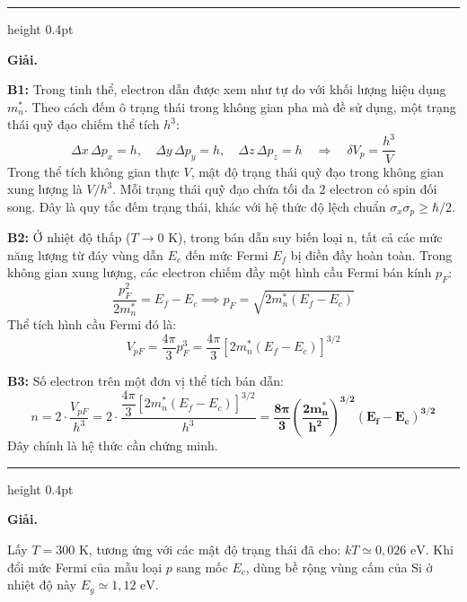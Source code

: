 \documentclass[11pt,a4paper]{article}
\renewcommand{\boldsymbol}[1]{\symbf{#1}}
\let\DeBaiOriginal\DeBai
\renewcommand{\DeBai}[1]{\par\Needspace{5\baselineskip}\DeBaiOriginal{#1}}
\newcommand{\PhanCachBai}{%
  \par\Needspace{7\baselineskip}%
  \addvspace{6pt}%
  {\color{black!40}\hrule height 0.4pt}%
  \nobreak\vspace{7pt}\nobreak
}
\begin{document}
\PhanCachBai


\textbf{Giải.}

\textbf{B1:} Trong tinh thể, electron dẫn được xem như tự do với khối lượng hiệu dụng $m_n^*$. Theo cách đếm ô trạng thái trong không gian pha mà đề sử dụng, một trạng thái quỹ đạo chiếm thể tích $h^3$:
\begin{equation*}
    \Delta x\,\Delta p_x=h,\quad \Delta y\,\Delta p_y=h,\quad \Delta z\,\Delta p_z=h\quad\Rightarrow\quad \delta V_p=\frac{h^3}{V}
\end{equation*}
Trong thể tích không gian thực $V$, mật độ trạng thái quỹ đạo trong không gian xung lượng là $V/h^3$. Mỗi trạng thái quỹ đạo chứa tối đa 2 electron có spin đối song. Đây là quy tắc đếm trạng thái, khác với hệ thức độ lệch chuẩn $\sigma_x\sigma_p\ge\hbar/2$.

\textbf{B2:} Ở nhiệt độ thấp ($T \to 0\text{ K}$), trong bán dẫn suy biến loại n, tất cả các mức năng lượng từ đáy vùng dẫn $E_c$ đến mức Fermi $E_f$ bị điền đầy hoàn toàn. Trong không gian xung lượng, các electron chiếm đầy một hình cầu Fermi bán kính $p_F$:
\begin{equation*}
    \frac{p_F^2}{2m_n^*} = E_f - E_c \implies p_F = \sqrt{2m_n^*(E_f - E_c)}
\end{equation*}
Thể tích hình cầu Fermi đó là:
\begin{equation*}
    V_{pF} = \frac{4\pi}{3} p_F^3 = \frac{4\pi}{3} \left[2m_n^*(E_f - E_c)\right]^{3/2}
\end{equation*}

\textbf{B3:} Số electron trên một đơn vị thể tích bán dẫn:
\begin{equation*}
    n = 2 \cdot \frac{V_{pF}}{h^3} = 2 \cdot \frac{\dfrac{4\pi}{3} \left[2m_n^*(E_f - E_c)\right]^{3/2}}{h^3} = \boldsymbol{\frac{8\pi}{3}\left(\frac{2m_n^*}{h^2}\right)^{3/2}(E_f - E_c)^{3/2}}
\end{equation*}
Đây chính là hệ thức cần chứng minh.

\PhanCachBai


\textbf{Giải.}

Lấy $T=300\text{ K}$, tương ứng với các mật độ trạng thái đã cho: $kT\simeq0{,}026\text{ eV}$. Khi đổi mức Fermi của mẫu loại $p$ sang mốc $E_c$, dùng bề rộng vùng cấm của Si ở nhiệt độ này $E_g\simeq1{,}12\text{ eV}$.
\end{document}
